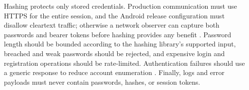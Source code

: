 Hashing protects only stored credentials. Production communication must use HTTPS for the entire session, and the Android release configuration must disallow cleartext traffic; otherwise a network observer can capture both passwords and bearer tokens before hashing provides any benefit \cite{AndroidNetworkSecurity,OWASPTLS}. Password length should be bounded according to the hashing library's supported input, breached and weak passwords should be rejected, and expensive login and registration operations should be rate-limited. Authentication failures should use a generic response to reduce account enumeration \cite{OWASPAuthentication}. Finally, logs and error payloads must never contain passwords, hashes, or session tokens.

